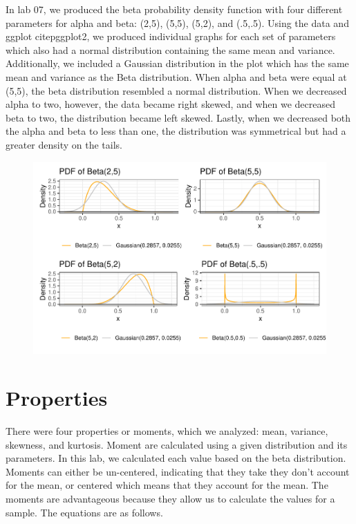 \documentclass{article}\usepackage[]{graphicx}\usepackage[]{xcolor}
\begin{document}
\begin{multicols}{2}
  In lab 07, we produced the beta probability density function with four different parameters for alpha and beta: (2,5), (5,5), (5,2), and (.5,.5). Using the data and ggplot citep{ggplot2}, we produced individual graphs for each set of parameters which also had a normal distribution containing the same mean and variance. Additionally, we included a Gaussian distribution in the plot which has the same mean and variance as the Beta distribution. When alpha and beta were equal at (5,5), the beta distribution resembled a normal distribution. When we decreased alpha to two, however, the data became right skewed, and when we decreased beta to two, the distribution became left skewed. Lastly, when we decreased both the alpha and beta to less than one, the distribution was symmetrical but had a greater density on the tails. 
  
  
   \begin{figure}[H]
    \begin{center}
       \includegraphics[scale=0.5]{densityf.pdf}
       \caption{}
     \label{densityf}
     \end{center}
   \end{figure}

\section{Properties}
There were four properties or moments, which we analyzed: mean, variance, skewness, and kurtosis. Moment are calculated using a given distribution and its parameters. In this lab, we calculated each value based on the beta distribution. Moments can either be un-centered, indicating that they take they don't account for the mean, or centered which means that they account for the mean. The moments are advantageous because they allow us to calculate the values for a sample. The equations are as follows. 



\end{multicols}
\end{document}
